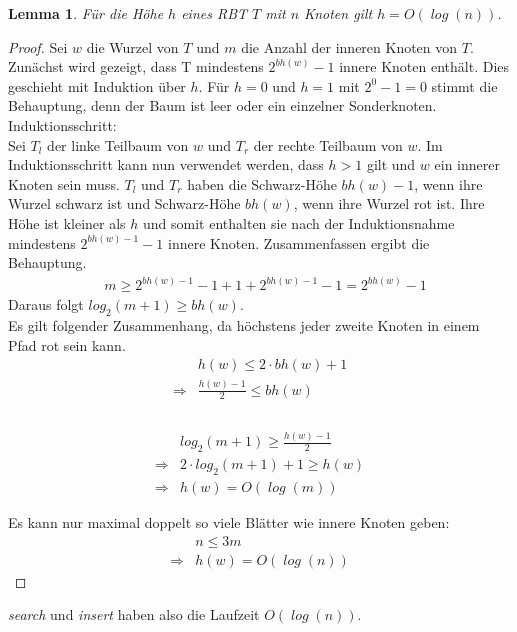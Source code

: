 \documentclass[a4paper,12pt]{article}
\newtheorem{Lemma}{Lemma}[section]
\begin{document}
\begin{Lemma} Für die Höhe $h$ eines RBT $T$ mit $n$ Knoten gilt $h = \mathit{O\left(\log \left(n\right)\right)}$. 
\end{Lemma}
\begin{proof}
	Sei $w$ die Wurzel von $T$ und $m$ die Anzahl der inneren Knoten von $T$. 
	Zunächst wird gezeigt, dass T mindestens $2^\mathit{bh(w)} - 1$ innere Knoten enthält.
	Dies geschieht mit Induktion über $h$. Für $h = 0$ und  $h = 1$ mit $2^0 - 1 = 0 $ stimmt die Behauptung, denn der Baum ist leer oder ein einzelner Sonderknoten. \\ 
	Induktionsschritt:\\
	Sei $T_l$ der linke Teilbaum von $w$ und $T_r$ der rechte Teilbaum von $w$.  
	Im Induktionsschritt kann nun verwendet werden, dass $h > 1$ gilt und $w$ ein innerer Knoten sein muss. $T_l$ und $T_r$ haben die Schwarz-Höhe $\mathit{bh(w)} - 1$, wenn ihre Wurzel schwarz ist und Schwarz-Höhe $\mathit{bh(w)}$, wenn ihre Wurzel rot ist. Ihre Höhe ist kleiner als $h$ und somit enthalten sie nach der Induktionsnahme mindestens  $2^\mathit{bh(w)- 1} - 1$ innere Knoten. Zusammenfassen ergibt die Behauptung.\\    
	\begin{align*}
	&m \geq 2^\mathit{bh(w)- 1} - 1  + 1  + 2^\mathit{bh(w)- 1} - 1 = 2^\mathit{bh(w)} - 1
	\end{align*}
	Daraus folgt $log_2(m + 1) \geq\mathit{bh(w)}$.\\
    Es gilt folgender Zusammenhang, da höchstens jeder zweite Knoten in einem Pfad rot sein kann.\\
	\begin{align*}
	&\mathit{h(w)} \leq 2 \cdot \mathit{bh(w) } + 1 \\
	\Rightarrow &\frac{\mathit{h(w)} - 1}{2} \leq\mathit{bh(w) } \\
	\end{align*}
	\\
	\begin{align*}
	&log_2(m + 1) \geq\frac{\mathit{h(w)} - 1}{2} \\
	\Rightarrow	&2 \cdot log_2(m + 1) + 1 \geq\mathit{h(w)} \\
	\Rightarrow &\mathit{h(w)} = \mathit{O\left(\log \left( {m}\right)\right)} 
	\end{align*}
	
	
	
	
	
	
	\noindent Es kann nur maximal doppelt so viele Blätter wie innere Knoten geben:
	\begin{align*}
	&n  \leq 3 m \\
	\Rightarrow &\mathit{h(w)} = \mathit{O\left(\log \left({n}\right)\right)} 
	\end{align*} 
	
	
\end{proof}
\noindent \textit{search} und \textit{insert} haben also die Laufzeit $\mathit{O\left(\log \left({n}\right)\right)}$.
\end{document}
